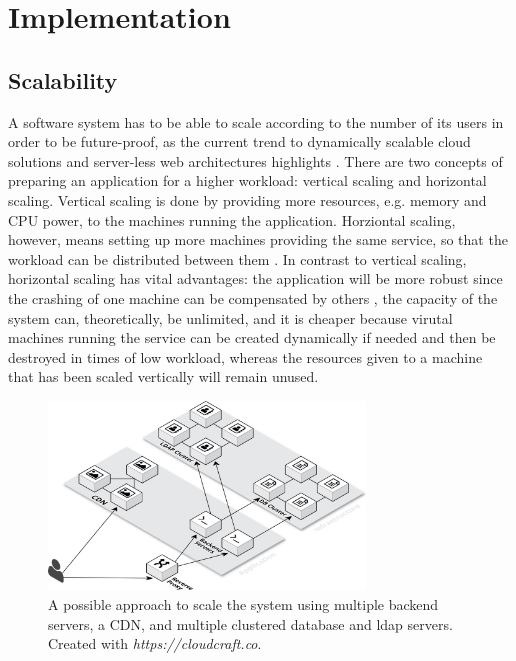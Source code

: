 \newpage
\section{Implementation}
\subsection{Scalability}
\label{scale}
A software system has to be able to scale according to the number of its users in order to be future-proof, as the current trend to dynamically scalable cloud solutions and server-less web architectures highlights \cite{allthecloud}. There are two concepts of preparing an application for a higher workload: vertical scaling and horizontal scaling. Vertical scaling is done by providing more resources, e.g. memory and CPU power, to the machines running the application. Horziontal scaling, however, means setting up more machines providing the same service, so that the workload can be distributed between them \cite{hvscale}. In contrast to vertical scaling, horizontal scaling has vital advantages: the application will be more robust since the crashing of one machine can be compensated by others \cite{fedi}, the capacity of the system can, theoretically, be unlimited, and it is cheaper because virutal machines running the service can be created dynamically if needed and then be destroyed in times of low workload, whereas the resources given to a machine that has been scaled vertically will remain unused.

\begin{figure}[!htp]
    \centering
    \includegraphics[width=0.75\textwidth]{images/system_architecture_scaled.png}
    \caption[Illustration: Scaled System Architecture]{A possible approach to scale the system using multiple backend servers, a CDN, and multiple clustered database and ldap servers. Created with \textit{https://cloudcraft.co}.}
    \label{scaleup}
\end{figure}

